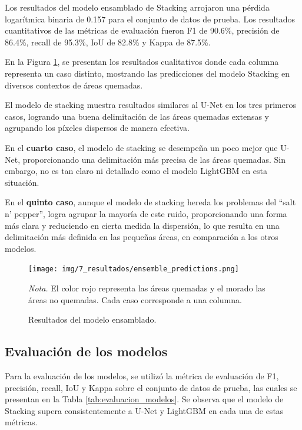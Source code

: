 Los resultados del modelo ensamblado de Stacking arrojaron una pérdida logarítmica binaria de 0.157 para el conjunto de datos de prueba. Los resultados cuantitativos de las 
métricas de evaluación fueron F1 de 90.6\%, precisión de 86.4\%, recall de 95.3\%, IoU de 82.8\% y Kappa de 87.5\%.

En la Figura \ref{fig:ensemble_resultados}, se presentan los resultados cualitativos donde cada columna representa un caso distinto, mostrando las predicciones del modelo 
Stacking en diversos contextos de áreas quemadas.

El modelo de stacking muestra resultados similares al U-Net en los tres primeros casos, logrando una buena delimitación de las áreas quemadas extensas y agrupando los 
píxeles dispersos de manera efectiva.

En el \textbf{cuarto caso}, el modelo de stacking se desempeña un poco mejor que U-Net, proporcionando una delimitación más precisa de las áreas quemadas. Sin embargo, 
no es tan claro ni detallado como el modelo LightGBM en esta situación.

En el \textbf{quinto caso}, aunque el modelo de stacking hereda los problemas del ``salt n' pepper'', logra agrupar la mayoría de este ruido, proporcionando una forma más 
clara y reduciendo en cierta medida la dispersión, lo que resulta en una delimitación más definida en las pequeñas áreas, en comparación a los otros modelos.

\begin{figure}[H]
    \centering
    \caption{Resultados del modelo ensamblado.}
    \label{fig:ensemble_resultados}
    \texttt{[image: img/7\_resultados/ensemble\_predictions.png]}
    \begin{flushleft}
        \vspace{-\baselineskip}
        \textit{Nota.} El color rojo representa las áreas quemadas y el morado las áreas no quemadas. Cada caso corresponde a una columna.
        \vspace{-\baselineskip}
    \end{flushleft}
\end{figure}

\subsection{Evaluación de los modelos}
Para la evaluación de los modelos, se utilizó la métrica de evaluación de F1, precisión, recall, IoU y Kappa sobre el conjunto de datos de
prueba, las cuales se presentan en la Tabla \ref{tab:evaluacion_modelos}. Se observa que el modelo de Stacking supera consistentemente a U-Net y LightGBM en cada una de 
estas métricas.

